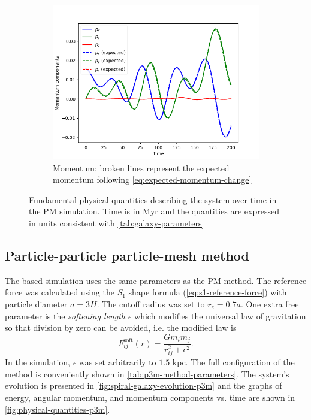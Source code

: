 \begin{figure}[!ht]
    \vspace{0.2cm}

    \begin{subfigure}[b]{0.45\textwidth}
        \centering
        \includegraphics[width=\textwidth]{chapters/results/img/pm-galaxy/momentum.png}
        \caption{Momentum; broken lines represent the expected momentum following \autoref{eq:expected-momentum-change}}
        \label{fig:physical-quantities-pm-sub3}
    \end{subfigure}

    \caption{Fundamental physical quantities describing the system over time in the PM simulation.
        Time is in Myr and the quantities are expressed in units consistent with \autoref{tab:galaxy-parameters}}
    \label{fig:physical-quantities-pm}
\end{figure}

\subsection{Particle-particle particle-mesh method}
The \PThreeM{} based simulation uses the same parameters as the PM method.
The reference force was calculated using the $S_1$ shape formula (\autoref{eq:s1-reference-force}) with particle diameter $a=3H$.
The cutoff radius was set to $r_e=0.7a$.
One extra free parameter is the \textit{softening length} $\epsilon$ which modifies the universal law of gravitation so that division by zero can be avoided, i.e. the modified law is
\begin{equation*}
    F^\text{soft}_{ij}(r) = \frac{G m_i m_j}{r_{ij}^2 + \epsilon^2}.
\end{equation*}
In the simulation, $\epsilon$ was set arbitrarily to $1.5$ kpc.
The full configuration of the \PThreeM{} method is conveniently shown in \autoref{tab:p3m-method-parameters}.
The system's evolution is presented in \autoref{fig:spiral-galaxy-evolution-p3m} and the graphs of energy, angular momentum, and momentum components vs. time are shown in \autoref{fig:physical-quantities-p3m}.

